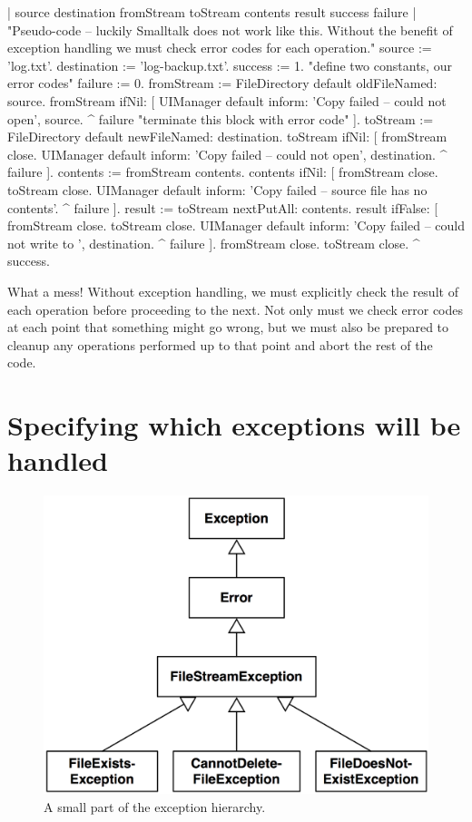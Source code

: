 \documentclass[a4paper,10pt,twoside]{book}
\begin{document}
\begin{code}{| source destination fromStream toStream contents result success failure |}
"Pseudo-code -- luckily Smalltalk does not work like this. Without the 
benefit of exception handling we must check error codes for each operation."
source := 'log.txt'.
destination := 'log-backup.txt'.
success := 1. "define two constants, our error codes"
failure := 0.
fromStream := FileDirectory default oldFileNamed: source.
fromStream ifNil: [
	UIManager default inform: 'Copy failed -- could not open', source.
	^ failure "terminate this block with error code" ].
toStream := FileDirectory default newFileNamed: destination.
toStream ifNil: [
	fromStream close.
	UIManager default inform: 'Copy failed -- could not open', destination.
	^ failure ].
contents := fromStream contents.
contents ifNil: [
	fromStream close.
	toStream close.
	UIManager default inform: 'Copy failed -- source file has no contents'.
	^ failure ].
result := toStream nextPutAll: contents.
result ifFalse: [
	fromStream close.
	toStream close.
	UIManager default inform: 'Copy failed -- could not write to ', destination.
	^ failure ].
fromStream close.
toStream close.
^ success.
\end{code}
\noindent
What a mess!
Without exception handling, we must explicitly check the result of each operation before proceeding to the next.
Not only must we check error codes at each point that something might go wrong, but we must also be prepared to cleanup any operations performed up to that point and abort the rest of the code.

\section{Specifying which exceptions will be handled}


\begin{figure}[t]\centering
        \includegraphics[width=.5\linewidth]{SimpleHierarchy}
        \caption{A small part of the \pharo exception hierarchy.}
\end{figure}
\end{document}
